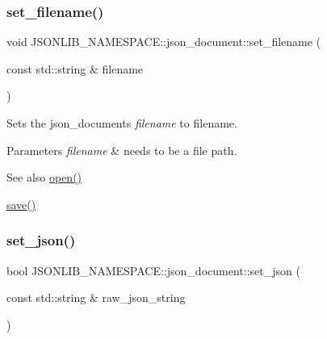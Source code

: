 \subsubsection{\texorpdfstring{set\+\_\+filename()}{set\_filename()}}
{\footnotesize\ttfamily void J\+S\+O\+N\+L\+I\+B\+\_\+\+N\+A\+M\+E\+S\+P\+A\+C\+E\+::json\+\_\+document\+::set\+\_\+filename (\begin{DoxyParamCaption}\item[{const std\+::string \&}]{filename }\end{DoxyParamCaption})}



Sets the json\+\_\+documents {\itshape filename} to {\ttfamily filename}. 


\begin{DoxyParams}{Parameters}
{\em filename} & needs to be a file path. \\
\hline
\end{DoxyParams}
\begin{DoxySeeAlso}{See also}
\hyperlink{classJSONLIB__NAMESPACE_1_1json__document_a08e509059e628742f35716dddce2d740}{open()} 

\hyperlink{classJSONLIB__NAMESPACE_1_1json__document_af8f392a0ffc779277ead1f2bdb222930}{save()} 
\end{DoxySeeAlso}
\mbox{\label{classJSONLIB__NAMESPACE_1_1json__document_a5a72e4dc0b37b95c70baefad930b5b71}} 
\subsubsection{\texorpdfstring{set\+\_\+json()}{set\_json()}\hspace{0.1cm}{\footnotesize\ttfamily [1/2]}}
{\footnotesize\ttfamily bool J\+S\+O\+N\+L\+I\+B\+\_\+\+N\+A\+M\+E\+S\+P\+A\+C\+E\+::json\+\_\+document\+::set\+\_\+json (\begin{DoxyParamCaption}\item[{const std\+::string \&}]{raw\+\_\+json\+\_\+string }\end{DoxyParamCaption})}



